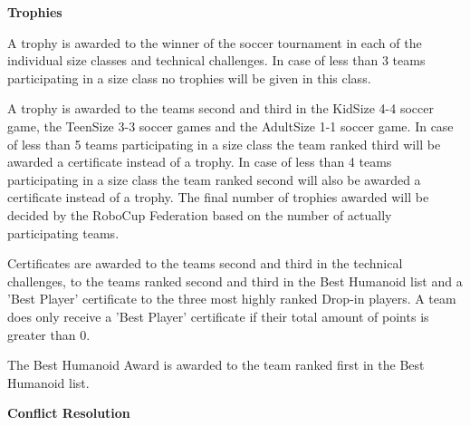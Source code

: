 \bigskip

{\bfseries Trophies}

\headlinebox

A trophy is awarded to the winner of the soccer tournament in each of the individual size classes and technical challenges. In case of less than 3 teams participating in a size class no trophies will be given in this class.

\bigskip

A trophy is awarded to the teams second and third in the KidSize 4-4 soccer game, the TeenSize 3-3 soccer games and the AdultSize 1-1 soccer game. In case of less than 5 teams participating in a size class the team ranked third will be awarded a certificate instead of a trophy. In case of less than 4 teams participating in a size class the team ranked second will also be awarded a certificate instead of a trophy. The final number of trophies awarded will be decided by the RoboCup Federation based on the number of actually participating teams.

\bigskip

Certificates are awarded to the teams second and third in the technical challenges, to the teams ranked second and third in the Best Humanoid list and a 'Best Player' certificate to the three most highly ranked Drop-in players. A team does only receive a 'Best Player' certificate if their total amount of points is greater than 0.

\bigskip

The Best Humanoid Award is awarded to the team ranked first in the Best Humanoid list.

\bigskip

{\bfseries Conflict Resolution}

\headlinebox


\bigskip

